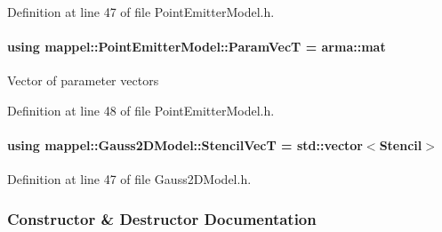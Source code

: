 Definition at line 47 of file Point\+Emitter\+Model.\+h.

\paragraph[{\texorpdfstring{Param\+VecT}{ParamVecT}}]{\setlength{\rightskip}{0pt plus 5cm}using {\bf mappel\+::\+Point\+Emitter\+Model\+::\+Param\+VecT} =  arma\+::mat\hspace{0.3cm}{\ttfamily [inherited]}}\hypertarget{classmappel_1_1PointEmitterModel_add253b568d763f1513a810aac35de719}{}\label{classmappel_1_1PointEmitterModel_add253b568d763f1513a810aac35de719}
Vector of parameter vectors 

Definition at line 48 of file Point\+Emitter\+Model.\+h.

\paragraph[{\texorpdfstring{Stencil\+VecT}{StencilVecT}}]{\setlength{\rightskip}{0pt plus 5cm}using {\bf mappel\+::\+Gauss2\+D\+Model\+::\+Stencil\+VecT} =  std\+::vector$<${\bf Stencil}$>$\hspace{0.3cm}{\ttfamily [inherited]}}\hypertarget{classmappel_1_1Gauss2DModel_acd9bb0363c841eaa629f68677ed2f214}{}\label{classmappel_1_1Gauss2DModel_acd9bb0363c841eaa629f68677ed2f214}


Definition at line 47 of file Gauss2\+D\+Model.\+h.



\subsubsection{Constructor \& Destructor Documentation}
